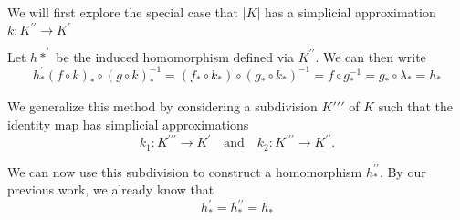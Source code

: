 \documentclass[draft,toc=bib]{scrartcl}
\theoremstyle{plain}
\theoremstyle{definition}
\theoremstyle{remark}
\newcommand{\pprime}{{\prime\prime}}
\newcommand{\ppprime}{{\pprime\prime}}
\newcommand{\qandq}{\quad \text{and} \quad}
\begin{document}
We will first explore the special case that $|K|$ has a simplicial approximation $k: K^\pprime\to K^\prime$

\begin{center}
	
\end{center}

Let $h\ast^\prime$ be the induced homomorphism defined via $K^\pprime$. We can then write
\[
h_\ast^\prime(f\circ k)_\ast\circ(g\circ k)_\ast^{-1}=(f_\ast\circ k_\ast)\circ(g_\ast\circ k_\ast)^{-1}=f\circ g_\ast^{-1}=g_\ast\circ\lambda_\ast=h_\ast
\]

We generalize this method by considering a subdivision $K\ppprime$ of $K$ such that the identity map has simplicial approximations
\[
k_1: K^\ppprime\to K^\prime\qandq k_2: K^\ppprime\to K^\pprime.
\]

We can now use this subdivision to construct a homomorphism $h_\ast^\pprime$. By our previous work, we already know that 
\[
h_\ast^\prime=h_\ast^\pprime=h_\ast
\]
\end{document}
